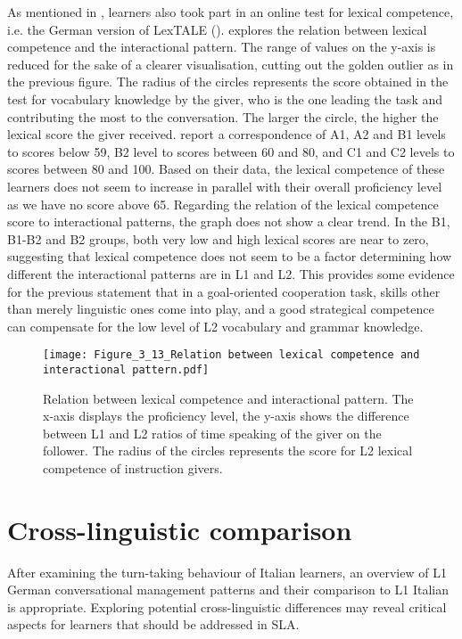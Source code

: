 As mentioned in , learners also took part in an online test for lexical competence, i.e. the German version of LexTALE (\citealt{LemhöferBroersma2012}).  explores the relation between lexical competence and the interactional pattern. The range of values on the y-axis is reduced for the sake of a clearer visualisation, cutting out the golden outlier as in the previous figure. The radius of the circles represents the score obtained in the test for vocabulary knowledge by the giver, who is the one leading the task and contributing the most to the conversation. The larger the circle, the higher the lexical score the giver received. \citet[341]{Broersma2012} report a correspondence of A1, A2 and B1 levels to scores below 59, B2 level to scores between 60 and 80, and C1 and C2 levels to scores between 80 and 100. Based on their data, the lexical competence of these learners does not seem to increase in parallel with their overall proficiency level as we have no score above 65. Regarding the relation of the lexical competence score to interactional patterns, the graph does not show a clear trend. In the B1, B1-B2 and B2 groups, both very low and high lexical scores are near to zero, suggesting that lexical competence does not seem to be a factor determining how different the interactional patterns are in L1 and L2. This provides some evidence for the previous statement that in a goal-oriented cooperation task, skills other than merely linguistic ones come into play, and a good strategical competence can compensate for the low level of L2 vocabulary and grammar knowledge.

\begin{figure}
\texttt{[image: Figure\_3\_13\_Relation between lexical competence and interactional pattern.pdf]}
\caption{Relation between lexical competence and interactional pattern. The x-axis displays the proficiency level, the y-axis shows the difference between L1 and L2 ratios of time speaking of the giver on the follower. The radius of the circles represents the score for L2 lexical competence of instruction givers.} 
\label{fig:3.13}
\end{figure}

\section{Cross-linguistic comparison}
\label{sec:3.5}
After examining the turn-taking behaviour of Italian learners, an overview of L1 German conversational management patterns and their comparison to L1 Italian is appropriate. Exploring potential cross-linguistic differences may reveal critical aspects for learners that should be addressed in SLA.


